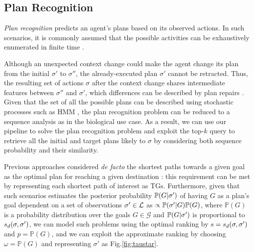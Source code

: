 
\subsection{Plan Recognition}
\textit{Plan recognition} predicts an agent's plans based on its observed actions. In such scenarios, it is commonly assumed that the possible activities can be exhaustively enumerated in finite time \cite{RamirezG09}. 

Although  an unexpected context change could make the agent change its plan from the initial $\sigma'$ to $\sigma''$, the already-executed plan $\sigma'$ cannot be retracted. Thus, the  resulting set of actions ${\sigma}$ after the context change  shares intermediate features between $\sigma''$ and $\sigma'$, which differences can be described by plan repairs \cite{FoxGLS06}. Given that the set of all the possible plans can be described using stochastic processes such as HMM \cite{LI2020101974}, the plan recognition problem can be reduced to a sequence analysis as in the biological use case. As a result, we can use our pipeline to solve the plan recognition problem and exploit the top-$k$ query to retrieve all the  initial and target plans likely to $\sigma$ by considering both sequence probability and their similarity.


Previous approaches considered \textit{de facto} the shortest paths towards a given goal as the optimal plan for reaching a given destination  \cite{RamirezG10}: this requirement can be met by representing each shortest path of interest as TGs. Furthermore, given that such scenarios estimates the posterior probability $\mathbb{P}(G|{\sigma'})$ of having $G$ as a plan's goal dependent on a set of observations ${\sigma'}\in\mathcal{L}$ as $\propto \mathbb{P}({\sigma'}|G)\mathbb{P}(G)$, where $\mathbb{P}(G)$ is a probability distribution  over the goals $G\in\mathcal{G}$ and $\mathbb{P}(G|{\sigma'})$ is  proportional to $s_d(\sigma,{\sigma'})$, we can model such problems using the optimal ranking by $s=s_d(\sigma,{\sigma'})$ and $p=\mathbb{P}(G)$, and we can exploit the approximate ranking by choosing $\omega=\mathbb{P}(G)$ and representing $\sigma'$ as Fig.\ref{fig:taustar}.